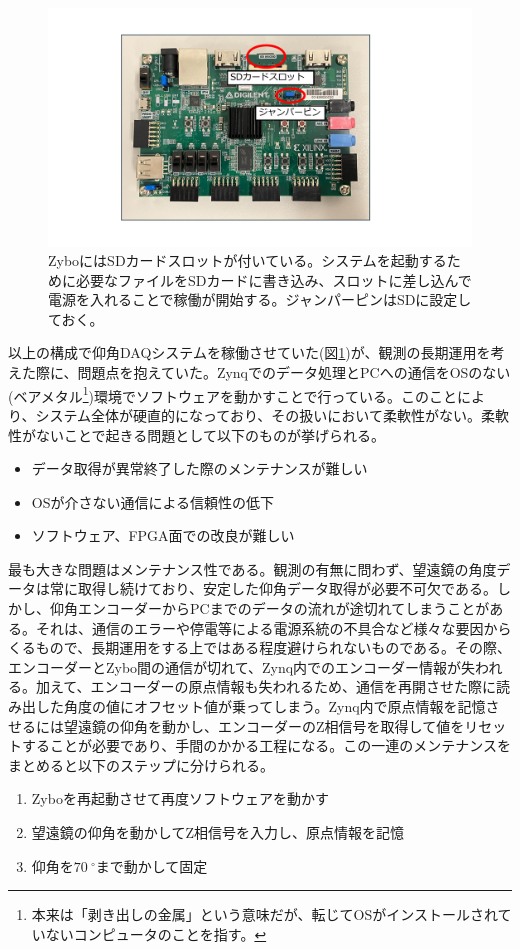 \begin{figure}[htbp]
  \centering
  \includegraphics[width=0.6\columnwidth]{4_elDAQ/figs/sd_zybo2.pdf}
  \caption{ZyboにはSDカードスロットが付いている。システムを起動するために必要なファイルをSDカードに書き込み、スロットに差し込んで電源を入れることで稼働が開始する。ジャンパーピンはSDに設定しておく。}
  \label{sd_zybo}
\end{figure}

以上の構成で仰角DAQシステムを稼働させていた(図\ref{sd_zybo})が、観測の長期運用を考えた際に、問題点を抱えていた。Zynqでのデータ処理とPCへの通信をOSのない(ベアメタル\footnote{本来は「剥き出しの金属」という意味だが、転じてOSがインストールされていないコンピュータのことを指す。})環境でソフトウェアを動かすことで行っている。このことにより、システム全体が硬直的になっており、その扱いにおいて柔軟性がない。柔軟性がないことで起きる問題として以下のものが挙げられる。
\begin{itemize}
  \item データ取得が異常終了した際のメンテナンスが難しい
  \item OSが介さない通信による信頼性の低下
  \item ソフトウェア、FPGA面での改良が難しい
\end{itemize}

最も大きな問題はメンテナンス性である。観測の有無に問わず、望遠鏡の角度データは常に取得し続けており、安定した仰角データ取得が必要不可欠である。しかし、仰角エンコーダーからPCまでのデータの流れが途切れてしまうことがある。それは、通信のエラーや停電等による電源系統の不具合など様々な要因からくるもので、長期運用をする上ではある程度避けられないものである。その際、エンコーダーとZybo間の通信が切れて、Zynq内でのエンコーダー情報が失われる。加えて、エンコーダーの原点情報も失われるため、通信を再開させた際に読み出した角度の値にオフセット値が乗ってしまう。Zynq内で原点情報を記憶させるには望遠鏡の仰角を動かし、エンコーダーのZ相信号を取得して値をリセットすることが必要であり、手間のかかる工程になる。この一連のメンテナンスをまとめると以下のステップに分けられる。
\begin{enumerate}
  \item Zyboを再起動させて再度ソフトウェアを動かす
  \item 望遠鏡の仰角を動かしてZ相信号を入力し、原点情報を記憶
  \item 仰角を$\SI{70}{^{\circ}}$まで動かして固定
\end{enumerate}

